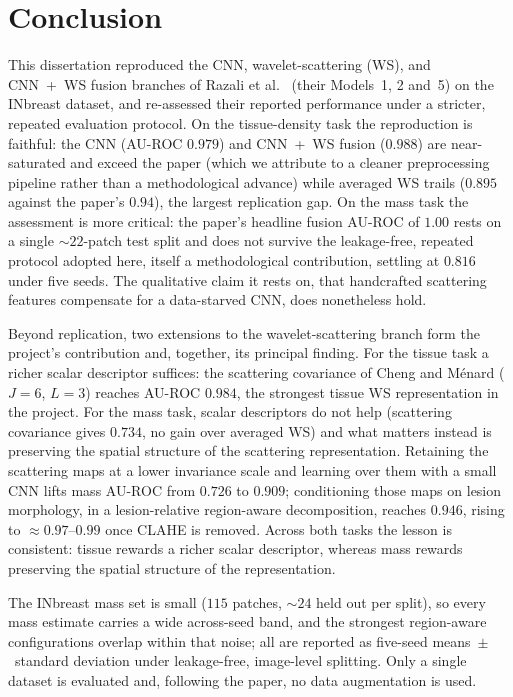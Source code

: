 
\chapter{Conclusion} \label{sec:conclusion}

This dissertation reproduced the CNN, wavelet-scattering (WS), and CNN~+~WS fusion branches of Razali et al.\ \cite{razali2023cnn} (their Models~1, 2 and~5) on the INbreast dataset, and re-assessed their reported performance under a stricter, repeated evaluation protocol. On the tissue-density task the reproduction is faithful: the CNN (AU-ROC $0.979$) and CNN~+~WS fusion ($0.988$) are near-saturated and exceed the paper (which we attribute to a cleaner preprocessing pipeline rather than a methodological advance) while averaged WS trails ($0.895$ against the paper's $0.94$), the largest replication gap. On the mass task the assessment is more critical: the paper's headline fusion AU-ROC of $1.00$ rests on a single ${\sim}22$-patch test split and does not survive the leakage-free, repeated protocol adopted here, itself a methodological contribution, settling at $0.816$ under five seeds. The qualitative claim it rests on, that handcrafted scattering features compensate for a data-starved CNN, does nonetheless hold.

Beyond replication, two extensions to the wavelet-scattering branch form the project's contribution and, together, its principal finding. For the tissue task a richer scalar descriptor suffices: the scattering covariance of Cheng and M\'enard ($J=6$, $L=3$) reaches AU-ROC $0.984$, the strongest tissue WS representation in the project. For the mass task, scalar descriptors do not help (scattering covariance gives $0.734$, no gain over averaged WS) and what matters instead is preserving the spatial structure of the scattering representation. Retaining the scattering maps at a lower invariance scale and learning over them with a small CNN lifts mass AU-ROC from $0.726$ to $0.909$; conditioning those maps on lesion morphology, in a lesion-relative region-aware decomposition, reaches $0.946$, rising to ${\approx}0.97$--$0.99$ once CLAHE is removed. Across both tasks the lesson is consistent: tissue rewards a richer scalar descriptor, whereas mass rewards preserving the spatial structure of the representation.

The INbreast mass set is small ($115$ patches, ${\sim}24$ held out per split), so every mass estimate carries a wide across-seed band, and the strongest region-aware configurations overlap within that noise; all are reported as five-seed means~$\pm$~standard deviation under leakage-free, image-level splitting. Only a single dataset is evaluated and, following the paper, no data augmentation is used.


